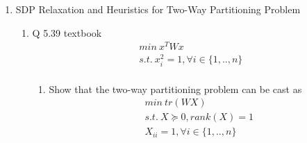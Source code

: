 \documentclass[12pt,letter]{article}
\begin{document}

\begin{enumerate}
  \item SDP Relaxation and Heuristics for Two-Way Partitioning Problem
  \begin{enumerate}
  \item Q 5.39 textbook\\
    \begin{align*}
      min\ x^T W x\\
      s.t.\ x_i^2 = 1, \forall i \in \{1,..,n\}\\
    \end{align*}
    \begin{enumerate}
    \item
    Show that the two-way partitioning problem can be cast as
    \begin{align*}
      min\ tr(WX)\\
      s.t.\ X \succeq 0, rank(X)=1\\
      X_{ii}=1, \forall i \in \{1,..,n\}
    \end{align*}


\end{enumerate}
\end{enumerate}
\end{enumerate}
\end{document}
